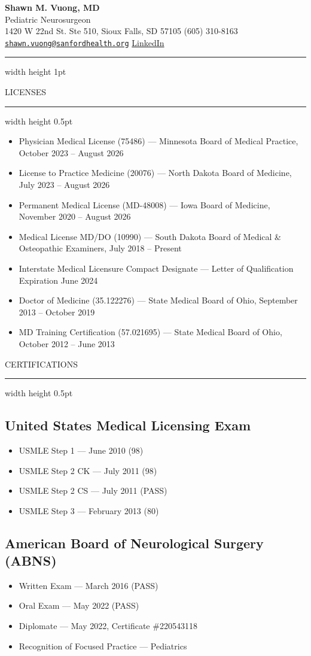 \documentclass[11pt, a4paper]{article}
\makeatletter
\newcommand{\CVname}{Shawn M. Vuong, MD}
\newcommand{\CVtitle}{Pediatric Neurosurgeon}
\newcommand{\CVaddress}{1420 W 22nd St. Ste 510, Sioux Falls, SD 57105}
\newcommand{\CVphone}{(605) 310-8163}
\newcommand{\CVemail}{shawn.vuong@sanfordhealth.org}
\newcommand{\CVlinkedin}{https://www.linkedin.com/in/shawnvuong/}
\newcommand{\makeheader}{%
  \begin{center}
    {\Huge\color{primary}\bfseries\CVname}\\[0.2em]
    {\large\color{secondary}\CVtitle}\\[0.5em]
    {\small
      \CVaddress{} \textbullet{} \CVphone{} \textbullet{} \hrefmailto{\CVemail}\textbullet{} \href{\CVlinkedin}{LinkedIn}
    }
  \end{center}
  \vspace{0.5em}
  \hrule width \linewidth height 1pt \color{primary}
  \vspace{0.5em}
}
\newcommand{\cvsection}[1]{%
  \par\vspace{1.5ex}%
  {\Large\color{primary}\scshape\MakeUppercase{#1}}%
  \nopagebreak[4]%
  \vspace{0.3em}%
  \nopagebreak[4]%
  \hrule width \linewidth height 0.5pt \color{primary}%
  \vspace{0.5ex}%
}
\def\hrefmailto#1{\href{#1}{\nolinkurl{#1}}}
\makeatother
\begin{document}
\makeheader

\cvsection{Licenses}
\begin{itemize}
  \setlength\itemindent{0.25em}
  \item Physician Medical License (75486) --- Minnesota Board of Medical Practice, October 2023 -- August 2026
  \item License to Practice Medicine (20076) --- North Dakota Board of Medicine, July 2023 -- August 2026
  \item Permanent Medical License (MD-48008) --- Iowa Board of Medicine, November 2020 -- August 2026
  \item Medical License MD/DO (10990) --- South Dakota Board of Medical \& Osteopathic Examiners, July 2018 -- Present
  \item Interstate Medical Licensure Compact Designate --- Letter of Qualification Expiration June 2024
  \item Doctor of Medicine (35.122276) --- State Medical Board of Ohio, September 2013 -- October 2019
  \item MD Training Certification (57.021695) --- State Medical Board of Ohio, October 2012 -- June 2013
\end{itemize}
\vspace{0.5em}

\cvsection{Certifications}

\subsection{United States Medical Licensing Exam}
\begin{itemize}
  \setlength\itemindent{0.25em}
  \item USMLE Step 1 --- June 2010 (98)
  \item USMLE Step 2 CK --- July 2011 (98)
  \item USMLE Step 2 CS --- July 2011 (PASS)
  \item USMLE Step 3 --- February 2013 (80)
\end{itemize}

\subsection{American Board of Neurological Surgery (ABNS)}
\begin{itemize}
  \setlength\itemindent{0.25em}
  \item Written Exam --- March 2016 (PASS)
  \item Oral Exam --- May 2022 (PASS)
  \item Diplomate --- May 2022, Certificate \#220543118
  \item Recognition of Focused Practice --- Pediatrics
\end{itemize}
\end{document}
